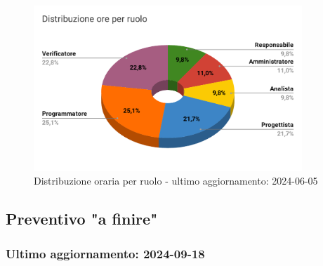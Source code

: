 \begin{figure}[H]
  \centering
  \includegraphics[width=0.90\textwidth]{assets/Preventivo/Totale/distribuzione_ore_ruolo.pdf}
  \caption{Distribuzione oraria per ruolo - ultimo aggiornamento: 2024-06-05}
\end{figure}

\subsection{Preventivo "a finire"}\label{sec:preventivo-a-finire}
\subsubsection{Ultimo aggiornamento: 2024-09-18}

